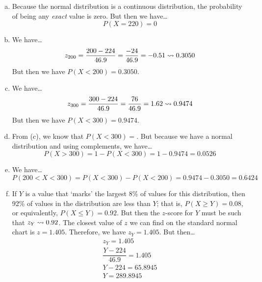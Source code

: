 \documentclass[11pt,letterpaper]{article}
\begin{document}
\sol 
\begin{enumerate}[(a)]
\item Because the normal distribution is a continuous distribution, the probability of being any \textit{exact} value is zero. But then we have\dots
	\[
	P(X= 220)= 0
	\]

\item We have\dots
	\[
	z_{200}= \dfrac{200 - 224}{46.9}= \dfrac{-24}{46.9}= -0.51 \rightsquigarrow 0.3050
	\]
But then we have $P(X < 200)= 0.3050$.

\item We have\dots
	\[
	z_{300}= \dfrac{300 - 224}{46.9}= \dfrac{76}{46.9}= 1.62 \rightsquigarrow 0.9474
	\]
But then we have $P(X < 300)= 0.9474$.

\item From (c), we know that $P(X < 300)= $. But because we have a normal distribution and using complements, we have\dots
	\[
	P(X > 300)= 1 - P(X < 300)= 1 - 0.9474= 0.0526
	\]

\item We have\dots
	\[
	P(200 < X < 300)= P(X < 300) - P(X < 200)= 0.9474 - 0.3050= 0.6424
	\]

\item If $Y$ is a value that `marks' the largest 8\% of values for this distribution, then 92\% of values in the distribution are less than $Y$; that is, $P(X \geq Y)= 0.08$, or equivalently, $P(X \leq Y)= 0.92$. But then the $z$-score for $Y$ must be such that $z_Y \rightsquigarrow 0.92$. The closest value of $z$ we can find on the standard normal chart is $z= 1.405$. Therefore, we have $z_Y= 1.405$. But then\dots
	\[
	\begin{gathered}
	z_Y= 1.405 \\[0.3cm]
	\dfrac{Y - 224}{46.9}= 1.405 \\[0.3cm]
	Y - 224= 65.8945 \\[0.3cm]
	Y= 289.8945
	\end{gathered}
	\]
\end{enumerate}
\end{document}
